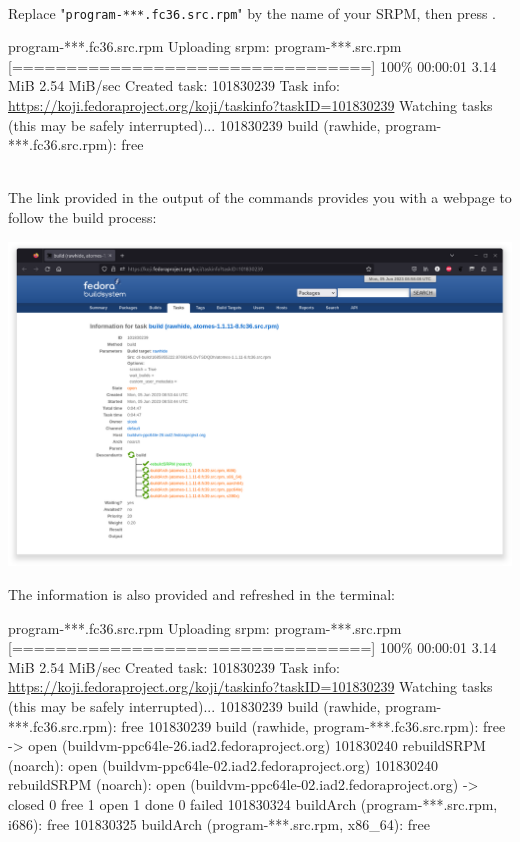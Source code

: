 \\[-0.5cm]
\noindent Replace "\texttt{program-***.fc36.src.rpm}" by the name of your SRPM, then press \Enter. 
\begin{script}
\fprompt{~}    program-***.fc36.src.rpm
Uploading srpm:  program-***.src.rpm
[=================================] 100\% 00:00:01   3.14 MiB   2.54 MiB/sec
Created task: 101830239
Task info: \href{https://koji.fedoraproject.org/koji/taskinfo?taskID=101830239}{https://koji.fedoraproject.org/koji/taskinfo?taskID=101830239}
Watching tasks (this may be safely interrupted)...
101830239 build (rawhide, program-***.fc36.src.rpm): free
\end{script}
\\[-0.25cm]
\noindent The link provided in the output of the commands provides you with a webpage to follow the build process:
\begin{center}
\includegraphics[width=1.0\textwidth,keepaspectratio=true,draft=\ddst]{img/rpms/koji-build.eps}
\end{center}
\newpage
\noindent The information is also provided and refreshed in the terminal:
{\scriptsize{
\begin{script}
\fprompt{~}    program-***.fc36.src.rpm
Uploading srpm:  program-***.src.rpm
[=================================] 100\% 00:00:01   3.14 MiB   2.54 MiB/sec
Created task: 101830239
Task info: \href{https://koji.fedoraproject.org/koji/taskinfo?taskID=101830239}{https://koji.fedoraproject.org/koji/taskinfo?taskID=101830239}
Watching tasks (this may be safely interrupted)...
101830239 build (rawhide, program-***.fc36.src.rpm): free
101830239 build (rawhide, program-***.fc36.src.rpm): free -> open (buildvm-ppc64le-26.iad2.fedoraproject.org)
  101830240 rebuildSRPM (noarch): open (buildvm-ppc64le-02.iad2.fedoraproject.org)
  101830240 rebuildSRPM (noarch): open (buildvm-ppc64le-02.iad2.fedoraproject.org) -> closed
  0 free  1 open  1 done  0 failed
  101830324 buildArch (program-***.src.rpm, i686): free
  101830325 buildArch (program-***.src.rpm, x86\_64): free
\end{script}
}}
